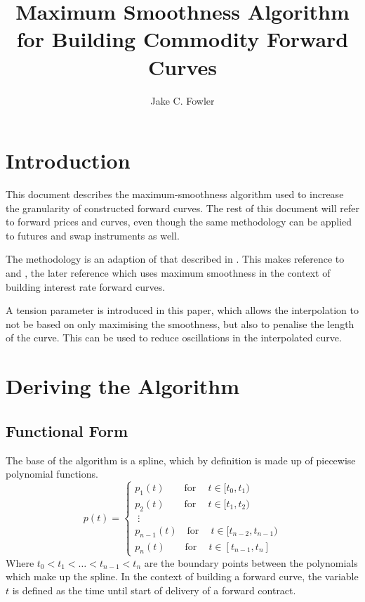 \documentclass{article}
\title{Maximum Smoothness Algorithm for Building Commodity Forward Curves}
\author{Jake C. Fowler}
\date{}
\begin{document}
\newcommand{\+}[1]{\ensuremath{\mathbf{#1}}}

\maketitle

\section{Introduction}
This document describes the maximum-smoothness algorithm used to increase the granularity of constructed forward curves.
The rest of this document will refer to forward prices and curves, even though the same methodology can be applied to futures and swap instruments as well.

\bigskip
The methodology is an adaption of that described in \citep{Unknown}. 
This makes reference to \cite{Benth} and \cite{Lim}, the later reference which uses maximum smoothness
in the context of building interest rate forward curves.

\bigskip

A tension parameter is introduced in this paper, which allows the interpolation to not be
based on only maximising the smoothness, but also to penalise the length of the curve. This
can be used to reduce oscillations in the interpolated curve.

\section{Deriving the Algorithm}
\subsection{Functional Form}
The base of the algorithm is a spline, which by definition is made up of piecewise polynomial functions.
\begin{equation}
p(t) = 
\begin{cases}
    p_1(t)\qquad \text{for}\ \quad t \in [t_0, t_1) \\
    p_2(t)\qquad \text{for}\ \quad t \in [t_1, t_2) \\
    \;\vdots \\
    p_{n-1}(t)\quad \text{for}\ \quad t \in [t_{n-2}, t_{n-1}) \\
    p_n(t)\qquad \text{for}\ \quad t \in [t_{n-1}, t_n]
\end{cases}
\end{equation}
Where $t_0 < t_1 < \hdots < t_{n-1} < t_{n}$ are the boundary points between the polynomials which make up the spline.
In the context of building a forward curve, the variable $t$ is defined as
the time until start of delivery of a forward contract.
\end{document}
